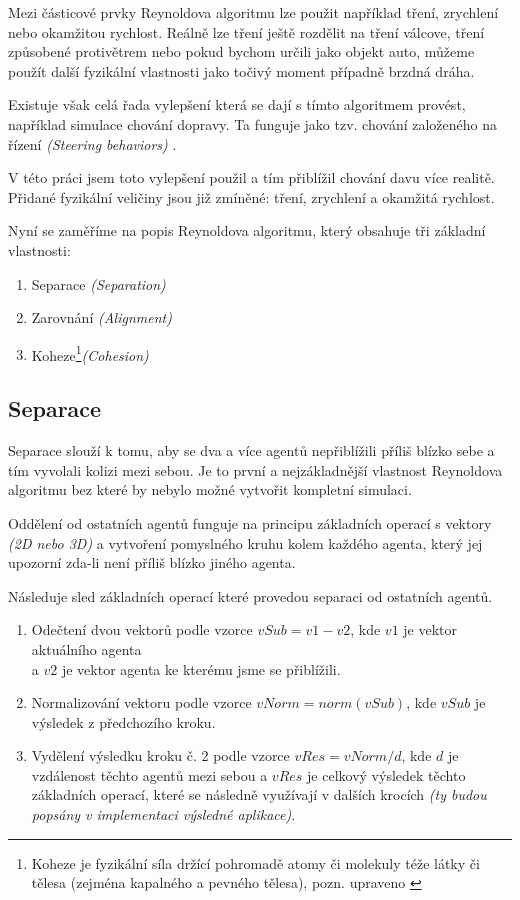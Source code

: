 \documentclass[czech,public,dept460,male,cpdeclaration]{diploma}
\begin{document}
Mezi částicové prvky Reynoldova algoritmu lze použit například tření, zrychlení nebo okamžitou rychlost. Reálně lze tření ještě rozdělit na tření válcove, tření způsobené protivětrem nebo pokud bychom určili jako objekt auto, můžeme použít další fyzikální vlastnosti jako točivý moment případně brzdná dráha.

Existuje však celá řada vylepšení která se dají s tímto algoritmem provést, například simulace chování dopravy. Ta funguje jako tzv. chování založeného na řízení \textit{(Steering behaviors)} \cite{linkToSteeringBehaviors}. 

V této práci jsem toto vylepšení použil a tím přiblížil chování davu více realitě. Přidané fyzikální veličiny jsou již zmíněné: tření, zrychlení a okamžitá rychlost.

\newpage
Nyní se zaměříme na popis Reynoldova algoritmu, který obsahuje tři základní vlastnosti:

\begin{enumerate}
	\item Separace \textit{(Separation)}
	\item Zarovnání \textit{(Alignment)}
	\item Koheze\footnote{Koheze je fyzikální síla držící pohromadě atomy či molekuly téže látky či tělesa (zejména
		kapalného a pevného tělesa), pozn. upraveno \cite{linkToCohesion}}\textit{(Cohesion)}
\end{enumerate}

\subsection{Separace}\label{sec:separace}
Separace slouží k tomu, aby se dva a více agentů nepřiblížili příliš blízko sebe a tím vyvolali kolizi mezi sebou. Je to první a nejzákladnější vlastnost Reynoldova algoritmu bez které by nebylo možné vytvořit kompletní simulaci. 

Oddělení od ostatních agentů funguje na principu základních operací s vektory \textit{(2D nebo 3D)} a vytvoření pomyslného kruhu kolem každého agenta, který jej upozorní zda-li není příliš blízko jiného agenta. 

Následuje sled základních operací které provedou separaci od ostatních agentů. 

\begin{enumerate}
	\item Odečtení dvou vektorů podle vzorce \(vSub = v1 - v2\), kde \(v1\) je vektor aktuálního agenta\\ a \(v2\) je vektor agenta ke kterému jsme se přiblížili.
	\item Normalizování vektoru podle vzorce \(vNorm = norm(vSub)\), kde \(vSub\) je výsledek z předchozího kroku.
	\item Vydělení výsledku kroku č. 2 podle vzorce \(vRes = vNorm / d\), kde \(d\) je vzdálenost těchto agentů mezi sebou a \(vRes\) je celkový výsledek těchto základních operací, které se následně využívají v dalších krocích \textit{(ty budou popsány v implementaci výsledné aplikace)}.
\end{enumerate}
\end{document}
